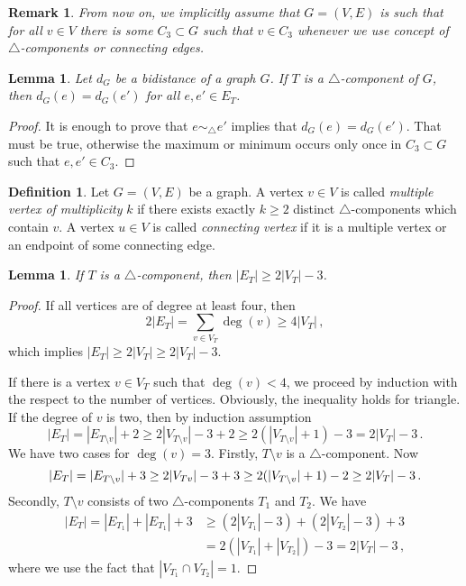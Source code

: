 \documentclass[a4paper, 11pt]{article}
\newcommand{\trcomp}{$\triangle$-component}
\newcommand{\trcomps}{$\triangle$-components}
\newtheorem{lem}[thm]{Lemma}
\newtheorem*{rem}{Remark}
\theoremstyle{definition}
\newtheorem{defn}{Definition}[section]
\begin{document}
\begin{rem}
From now on, we implicitly assume that $G=(V,E)$ is such that for all $v\in V$ there is some $C_3\subset G$ such that $v\in C_3$ whenever we use concept of \trcomps{} or connecting edges.
\end{rem}

\begin{lem}
\label{lem:bidistanceInTrcomp}
Let $d_G$ be a bidistance of a graph $G$. If $T$ is a \trcomp{} of $G$, then $d_G(e)=d_G(e')$ for all $e,e'\in E_T$.
\end{lem}
\begin{proof}
It is enough to prove that $e \sim_{\!\!\bigtriangleup} e'$ implies that $d_G(e)=d_G(e')$. That must be true, otherwise the maximum or minimum occurs only once in $C_3\subset G$ such that $e,e'\in C_3$.
\end{proof}





\begin{defn}
Let $G=(V,E)$ be a graph. A vertex $v\in V$ is called \emph{multiple vertex of multiplicity} $k$ if there exists exactly $k\geq 2$ distinct \trcomps{} which contain $v$. A vertex $u\in V$ is called \emph{connecting vertex} if it is a multiple vertex or an endpoint of some connecting edge.
\end{defn}

\begin{lem}
If $T$ is a \trcomp{}, then $|E_T|\geq 2|V_T|-3$.
\label{lem:sizeTriangleComponent}
\end{lem}
\begin{proof}
If all vertices are of degree at least four, then $$2|E_T|=\sum_{v\in V_T} \deg(v) \geq 4|V_T|\,,$$ which implies $|E_T|\geq 2|V_T|\geq 2|V_T|-3$.

If there is a vertex $v\in V_T$ such that $\deg(v)<4$, we proceed by induction with the respect to the number of vertices. Obviously, the inequality holds for triangle. If the degree of $v$ is two, then by induction assumption
$$
|E_T|=|E_{T\setminus v}|+2\geq 2 |V_{T\setminus v}|-3 +2\geq 2 (|V_{T\setminus v}|+1)-3=2 |V_{T}|-3\,.
$$
We have two cases for $\deg(v)=3$. Firstly, $T\setminus v$ is a \trcomp{}. Now $$|E_T|=|E_{T\setminus v}|+3\geq 2 |V_{T\\v}|-3 +3\geq 2 (|V_{T\setminus v}|+1)-2\geq 2 |V_{T}|-3\,.$$ Secondly, $T\setminus v$ consists of two \trcomps{} $T_1$ and $T_2$. We have
\begin{align*}
|E_T|=|E_{T_1}|+|E_{T_1}|+3 &\geq (2 |V_{T_1}|-3)+(2 |V_{T_2}|-3) +3 \\
			&= 2(|V_{T_1}| +|V_{T_2}|)-3=2 |V_{T}|-3\,,
\end{align*}
where we use the fact that $|V_{T_1} \cap V_{T_2}|=1$.
\end{proof}
\end{document}
